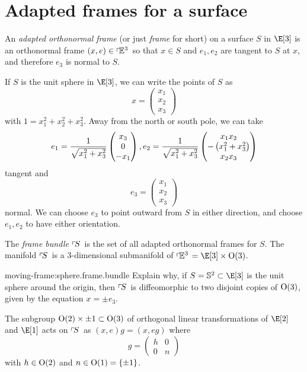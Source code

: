 \section{Adapted frames for a surface}
An \emph{adapted orthonormal frame}%
(or just \emph{frame} for short) on a surface \(S\) in \(\E[3]\) is an orthonormal frame \((x,e) \in \left\ulcorner\!\mathbb{E}^{3}\right.\) so that \(x \in S\) and \(e_1, e_2\) are tangent to \(S\) at \(x\), and therefore \(e_3\) is normal to \(S\).
\begin{example} 
If \(S\) is the unit sphere in \(\E[3]\), we can write the points of \(S\) as
\[
x
=
\begin{pmatrix}
x_1 \\
x_2 \\
x_3
\end{pmatrix}
\]
with \(1=x_1^2+x_2^2+x_3^2\).
Away from the north or south pole, we can take
\[
e_1
=
\frac{1}{\sqrt{x_1^2+x_3^2}}
\begin{pmatrix}
x_3 \\
0 \\
-x_1
\end{pmatrix},
e_2
=
\frac{1}{\sqrt{x_1^2+x_3^2}}
\begin{pmatrix}
x_1 x_2 \\
-\left(x_1^2+x_3^2\right) \\
x_2 x_3
\end{pmatrix}
\]
tangent and 
\[
 e_3=
 \begin{pmatrix}
  x_1 \\
  x_2 \\
  x_3
 \end{pmatrix}
\]
normal.
We can choose \(e_3\) to point outward from \(S\) in either direction, and choose \(e_1, e_2\) to have either orientation.
\end{example}
The \emph{frame bundle}%
\(\left\ulcorner\!S\right.\) is the set of all adapted orthonormal frames for \(S\).
The manifold \(\left\ulcorner\!S\right.\) is a \(3\)-dimensional submanifold of \(\frameBundleE{3}=\E[3] \times \Orth{3}\).
\begin{problem}{moving-frame:sphere.frame.bundle}
Explain why, if \(S=\mathbb{S}^2 \subset \E[3]\) is the unit sphere around the origin, then \(\left\ulcorner\!S\right.\) is diffeomorphic to two disjoint copies of \(\textrm{O}\!\left(3\right)\), given by the equation \(x=\pm e_3\).
\end{problem}
The subgroup \(\textrm{O}\!\left(2\right) \times \pm 1 \subset \textrm{O}\!\left(3\right)\) of orthogonal linear transformations of \(\E[2]\) and \(\E[1]\) acts on \(\left\ulcorner\!S\right.\) as \((x,e)g=(x,eg)\) where 
\[
 g=\begin{pmatrix}
    h & 0 \\
    0 & n
   \end{pmatrix}
\]
with \(h \in \textrm{O}\!\left(2\right)\) and \(n\in\textrm{O}\!\left(1\right)=\{\pm 1\}\).

